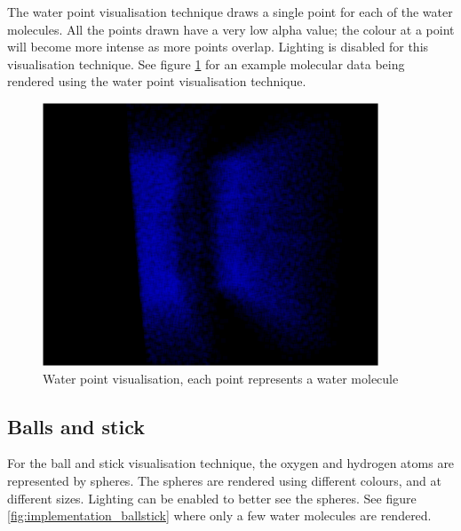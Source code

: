 The water point visualisation technique draws a single point for each of the
water molecules. All the points drawn have a very low alpha value; the colour
at a point will become more intense as more points overlap. Lighting is
disabled for this visualisation technique. See figure
\ref{fig:implementation_waterpoint} for an example molecular data being
rendered using the water point visualisation technique.

\begin{figure}[h!]
  \begin{center}
    \includegraphics[width=100mm]{waterpoint}
  \end{center}
  \caption{Water point visualisation, each point represents a water molecule}
  \label{fig:implementation_waterpoint}
\end{figure}


\subsection{Balls and stick}
\label{sub:implementation_ballstick}

For the ball and stick visualisation technique, the oxygen and hydrogen atoms
are represented by spheres. The spheres are rendered using different colours,
and at different sizes. Lighting can be enabled to better see the spheres. See
figure \ref{fig:implementation_ballstick} where only a few water molecules are
rendered.

